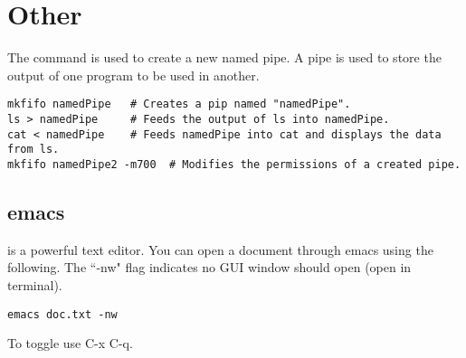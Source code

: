 \section{Other}
\lstset{language=Bash, style=terminalstyle}

The  command is used to create a new named pipe. A pipe is used to store the output of one program to be used in another.
\begin{lstlisting}
mkfifo namedPipe   # Creates a pip named "namedPipe".
ls > namedPipe     # Feeds the output of ls into namedPipe.
cat < namedPipe    # Feeds namedPipe into cat and displays the data from ls.
mkfifo namedPipe2 -m700  # Modifies the permissions of a created pipe.
\end{lstlisting}

\subsection{emacs}
 is a powerful text editor. You can open a document through emacs using the following. The ``-nw" flag indicates no GUI window should open (open in terminal).
\begin{lstlisting}
emacs doc.txt -nw
\end{lstlisting}
To toggle  use C-x C-q.
